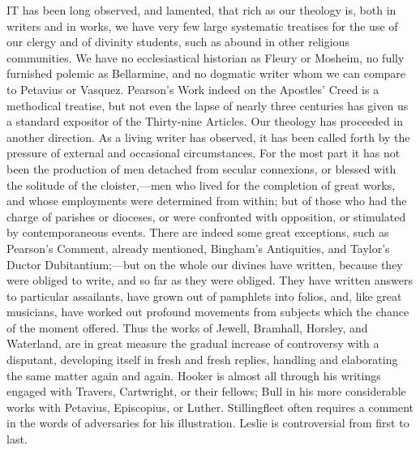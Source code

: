 IT
has been long observed, and lamented, that rich as our theology is,
both in writers and in works, we have very few large systematic
treatises for the use of our clergy and of divinity students, such as
abound in other religious communities. We have no ecclesiastical
historian as Fleury or Mosheim, no fully furnished polemic as
Bellarmine, and no dogmatic writer whom we can compare to Petavius or
Vasquez. Pearson's Work indeed on the Apostles' Creed is a methodical
treatise, but not even the lapse of nearly three centuries has given
us a standard expositor of the Thirty-nine Articles. Our theology has
proceeded in another direction. As a living writer has observed, it
has been called forth by the pressure of external and occasional
circumstances. For the most part it has not been the production of men
detached from secular connexions, or blessed with the solitude of the
cloister,—men who lived for the completion of great works, and whose
employments were determined from within; but of those who had the
charge of parishes or dioceses, or were confronted with opposition, or
stimulated by contemporaneous events. There are indeed some great
exceptions, such as Pearson's Comment, already mentioned, Bingham's
Antiquities, and Taylor's Ductor Dubitantium;—but on the whole our
divines have written, because they were obliged to write, and so
far as they were obliged. They have written answers to particular
assailants, have grown out of pamphlets into folios, and, like great
musicians, have worked out profound movements from subjects which the
chance of the moment offered. Thus the works of Jewell, Bramhall,
Horsley, and Waterland, are in great measure the gradual increase of
controversy with a disputant, developing itself in fresh and fresh
replies, handling and elaborating the same matter again and again.
Hooker is almost all through his writings engaged with Travers,
Cartwright, or their fellows; Bull in his more considerable works with
Petavius, Episcopius, or Luther. Stillingfleet often requires a
comment in the words of adversaries for his illustration. Leslie is
controversial from first to last.

